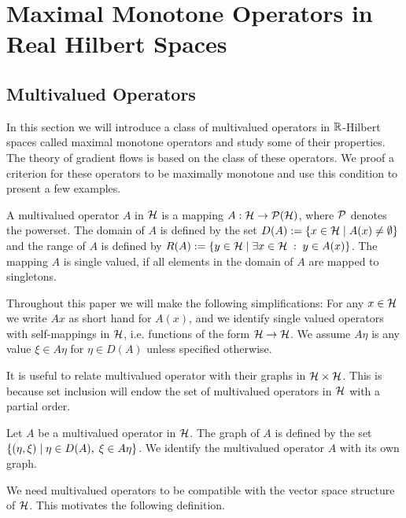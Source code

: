 \section{Maximal Monotone Operators in Real Hilbert Spaces}

\subsection{Multivalued Operators}

In this section we will introduce a class of multivalued operators
in $\mathbb{R}$-Hilbert spaces called maximal monotone operators and study
some of their properties. The theory of gradient flows is based on the class 
of these operators. We proof a criterion for these operators to be 
maximally monotone and use this condition to present a few examples.

\begin{definition}
	A multivalued operator $ A $ in $ \mathcal{H} $ is a mapping $ A:\mathcal{H} \rightarrow \mathcal{P}(\mathcal{H})$,
	where $ \mathcal{P} $ denotes the powerset. 
	The domain of $ A $ is defined by the set $ D(A):=\{x\in \mathcal{H} \;\vert\; A(x) \neq \emptyset\} $ and the range of $ A $ is defined by 
	$ R(A):=\{y\in\mathcal{H} \;\vert\; \exists x \in \mathcal{H} \;:\; y \in A(x) \} $.
	The mapping $ A $ is single valued, if all elements in the domain of $ A $
	are mapped to singletons.
\end{definition}

Throughout this paper we will make the following simplifications:
For any $ x \in \mathcal{H} $ we write $ Ax $ as short hand for $ A(x) $, and 
we identify single valued operators with self-mappings in $ \mathcal{H} $,
i.e. functions of the form $ \mathcal{H}\rightarrow\mathcal{H} $. 
We assume $ A\eta $ is any value $ \xi\in A\eta $ for $ \eta\in D(A) $ 
unless specified otherwise. \medskip

It is useful to relate multivalued operator with their graphs in $ \mathcal{H}\times \mathcal{H} $. 
This is because set inclusion will endow the set of multivalued operators in 
$ \mathcal{H} $ with a partial order.

\begin{definition}
	Let $ A $ be a multivalued operator in $ \mathcal{H} $.
	The graph of $ A $ is defined by the set 
	$ \{(\eta,\xi) \;\vert\; \eta\in D(A),\; \xi\in A\eta\} $.
	We identify the multivalued operator $ A $ with its own graph. 
\end{definition}

We need multivalued operators to be compatible with the vector space structure of 
$ \mathcal{H} $. This motivates the following definition.

